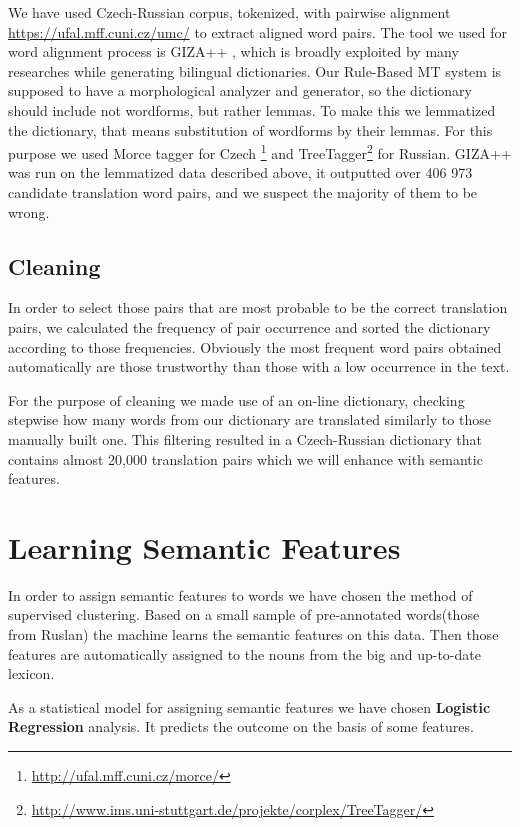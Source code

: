 \documentclass[10pt,a5paper,twoside]{article}
\begin{document}
We have used Czech-Russian corpus,  tokenized, with pairwise alignment
\url{https://ufal.mff.cuni.cz/umc/}
to extract aligned word pairs.
The tool we used for word alignment process is GIZA++ \cite{och00},
which is broadly exploited by many researches while generating
bilingual dictionaries.
Our Rule-Based MT system is supposed to have a morphological
analyzer and generator, so the dictionary should include not wordforms,
but rather lemmas. To make this we lemmatized the dictionary,
that means substitution of wordforms by their lemmas.
For this purpose we used Morce tagger for Czech \footnote{\url{http://ufal.mff.cuni.cz/morce/}}
and TreeTagger\footnote{\url{http://www.ims.uni-stuttgart.de/projekte/corplex/TreeTagger/}}
for Russian.
GIZA++ was run on the lemmatized data described above, it
outputted over 406 973 candidate translation word pairs, and we suspect the
majority of them to be wrong.
\subsection{Cleaning}
In order to select those pairs that are most probable to be the correct
translation pairs, we calculated the frequency of pair occurrence and
sorted the dictionary according to those frequencies.
Obviously the most frequent word pairs obtained automatically
are those trustworthy than those with a low occurrence in the text.

For the purpose of cleaning we made use of an on-line dictionary, checking
stepwise how many words from our dictionary are translated similarly to those
manually built one. This filtering resulted in a Czech-Russian
dictionary that contains almost 20,000 translation pairs which we will 
enhance with semantic features. 

\section{Learning Semantic Features}
In order to assign semantic features to words
we have chosen the method of supervised clustering. Based
on a small sample of pre-annotated words(those from Ruslan)
the machine learns the semantic features on this data. Then those
features are automatically assigned to the nouns from the big and 
up-to-date lexicon. 

As a statistical model for assigning semantic features we have chosen
\textbf{Logistic Regression} analysis. It predicts the outcome on the basis of
some features. %
\end{document}
